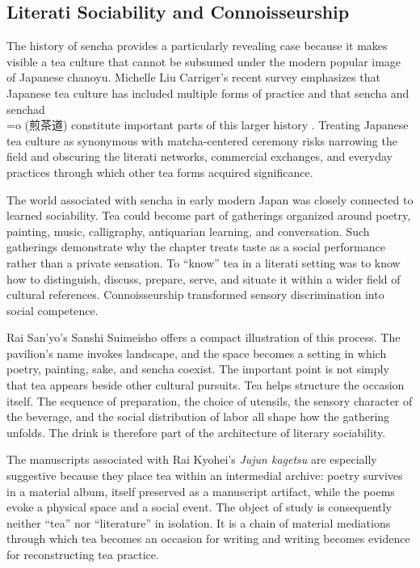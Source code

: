 \documentclass[numbers]{IntechOpen-Book}
\newcommand{\zh}[1]{{\CJKfontspec{Noto Serif CJK SC}\upshape #1}}
\begin{document}
\subsection{Literati Sociability and Connoisseurship}

The history of sencha provides a particularly revealing case because it makes visible a tea culture that cannot be subsumed under the modern popular image of Japanese chanoyu. Michelle Liu Carriger's recent survey emphasizes that Japanese tea culture has included multiple forms of practice and that sencha and senchad\\=o (\zh{煎茶道}) constitute important parts of this larger history \cite{carriger}. Treating Japanese tea culture as synonymous with matcha-centered ceremony risks narrowing the field and obscuring the literati networks, commercial exchanges, and everyday practices through which other tea forms acquired significance.

The world associated with sencha in early modern Japan was closely connected to learned sociability. Tea could become part of gatherings organized around poetry, painting, music, calligraphy, antiquarian learning, and conversation. Such gatherings demonstrate why the chapter treats taste as a social performance rather than a private sensation. To ``know'' tea in a literati setting was to know how to distinguish, discuss, prepare, serve, and situate it within a wider field of cultural references. Connoisseurship transformed sensory discrimination into social competence.

Rai San'yo's Sanshi Suimeisho offers a compact illustration of this process. The pavilion's name invokes landscape, and the space becomes a setting in which poetry, painting, sake, and sencha coexist. The important point is not simply that tea appears beside other cultural pursuits. Tea helps structure the occasion itself. The sequence of preparation, the choice of utensils, the sensory character of the beverage, and the social distribution of labor all shape how the gathering unfolds. The drink is therefore part of the architecture of literary sociability.

The manuscripts associated with Rai Kyohei's \textit{Jujun kagetsu} are especially suggestive because they place tea within an intermedial archive: poetry survives in a material album, itself preserved as a manuscript artifact, while the poems evoke a physical space and a social event. The object of study is consequently neither ``tea'' nor ``literature'' in isolation. It is a chain of material mediations through which tea becomes an occasion for writing and writing becomes evidence for reconstructing tea practice.
\end{document}
